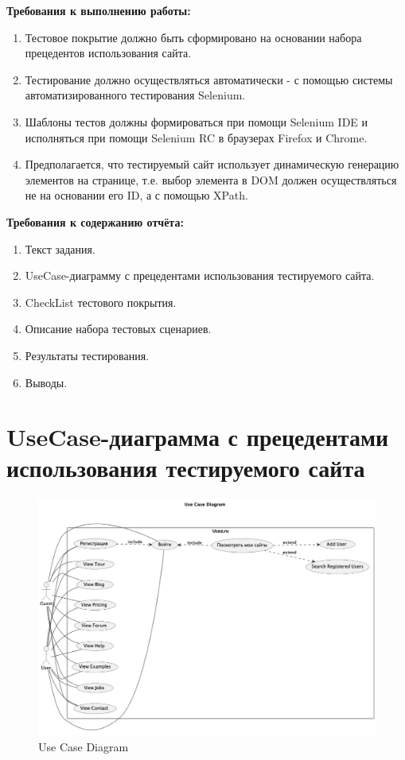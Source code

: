 \documentclass[12pt,onecolumn]{article}
\begin{document}
\begin{center}
\end{center}

\textbf{Требования к выполнению работы:}
\begin{enumerate}
  \item Тестовое покрытие должно быть сформировано на основании набора прецедентов использования сайта.
  \item Тестирование должно осуществляться автоматически - с помощью системы автоматизированного тестирования Selenium.
  \item Шаблоны тестов должны формироваться при помощи Selenium IDE и исполняться при помощи Selenium RC в браузерах Firefox и Chrome.
  \item Предполагается, что тестируемый сайт использует динамическую генерацию элементов на странице, т.е. выбор элемента в DOM должен осуществляться не на основании его ID, а с помощью XPath.
\end{enumerate}
\textbf{Требования к содержанию отчёта:}
\begin{enumerate}
  \item Текст задания.
  \item UseCase-диаграмму с прецедентами использования тестируемого сайта.
  \item CheckList тестового покрытия.
  \item Описание набора тестовых сценариев.
  \item Результаты тестирования.
  \item Выводы.
\end{enumerate}

\section*{UseCase-диаграмма с прецедентами использования тестируемого сайта}

\begin{figure}[H]
  \centering
  \includegraphics[width=\textwidth]{image/usecase.png}
  \caption{Use Case Diagram}
  \label{fig:usecase}
\end{figure}
\end{document}
